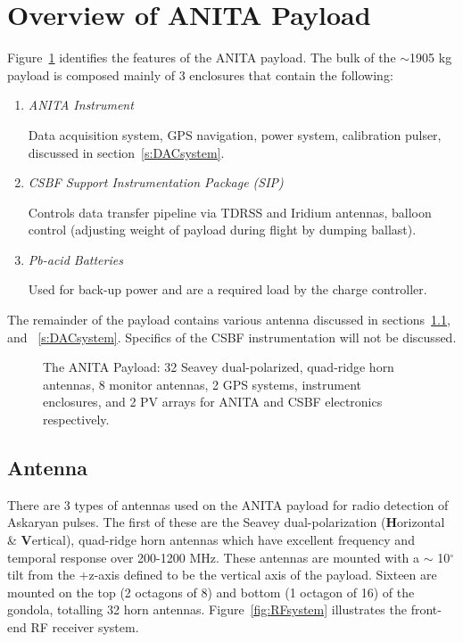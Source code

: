 \section{Overview of ANITA Payload}
\label{s:payload}
Figure~\ref{fig:payload} identifies the features of the ANITA payload.  The bulk of the $\sim$1905 kg payload is composed mainly of 3 enclosures that contain the following:

\begin{enumerate}
\item \emph{ANITA Instrument} \par Data acquisition system, GPS navigation, power system, calibration pulser, discussed in section~\ref{s:DACsystem}.
\item \emph{CSBF Support Instrumentation Package (SIP)} \par Controls data transfer pipeline via TDRSS and Iridium antennas, balloon control (adjusting weight of payload during flight by dumping ballast).
\item \emph{Pb-acid Batteries} \par Used for back-up power and are a required load by the charge controller.
\end{enumerate}

\noindent The remainder of the payload contains various antenna discussed in sections~\ref{ss:Antenna}, and ~\ref{s:DACsystem}.  Specifics of the CSBF instrumentation will not be discussed.

\begin{figure}[htbp]
\centering
\epsfxsize=4.0in
\caption{The ANITA Payload:  32 Seavey dual-polarized, quad-ridge horn antennas, 8 monitor antennas, 2 GPS systems, instrument enclosures, and 2 PV arrays for ANITA and CSBF electronics respectively.}
\label{fig:payload}
\end{figure}

\subsection{Antenna}
\label{ss:Antenna}
There are 3 types of antennas used on the ANITA payload for radio detection of Askaryan pulses.  The first of these are the Seavey dual-polarization (\textbf{H}orizontal \& \textbf{V}ertical), quad-ridge horn antennas which have excellent frequency and temporal response over 200-1200 MHz.  These antennas are mounted with a $\sim$ 10$^{\circ}$ tilt from the +z-axis defined to be the vertical axis of the payload.  Sixteen are mounted on the top (2 octagons of 8) and bottom (1 octagon of 16) of the gondola, totalling 32 horn antennas.  Figure~\ref{fig:RFsystem} illustrates the front-end RF receiver system.

